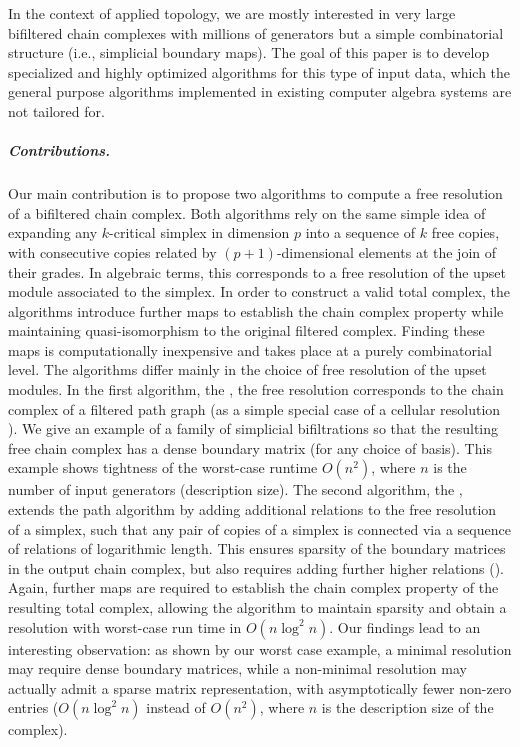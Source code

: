 In the context of applied topology, we are mostly interested in very large bifiltered chain complexes with millions of generators but a simple combinatorial structure (i.e., simplicial boundary maps).
The goal of this paper is to develop specialized and highly optimized algorithms for this type of input data, which the general purpose algorithms implemented in existing computer algebra systems are not tailored for.
%
\subparagraph{Contributions.}
%
Our main contribution is to propose two algorithms to compute a free resolution of a bifiltered chain complex. 
Both algorithms rely on the same simple idea of expanding any $k$-critical simplex in dimension $p$ into a sequence of $k$ free copies, with consecutive copies related by $(p+1)$-dimensional elements at the join of their grades.
In algebraic terms, this corresponds to a free resolution of the upset module associated to the simplex.
In order to construct a valid total complex,
the algorithms introduce further maps to establish the chain complex property while maintaining quasi-isomorphism to the original filtered complex.
Finding these maps is computationally inexpensive and takes place at a purely combinatorial level.
%
%
The algorithms differ mainly in the choice of free resolution of the upset modules. 
In the first algorithm, the , the free resolution corresponds to the chain complex of a filtered path graph (as a simple special case of a cellular resolution \cite{bayer_sturmfels_cellular,miller_sturmfels_book}).
We give an example of a family of simplicial bifiltrations so that the resulting free chain complex has a dense boundary matrix (for any choice of basis).
This example shows tightness of the worst-case runtime $O(n^2)$, where $n$ is the number of input generators (description size). 
%
%
The second algorithm, the , extends the path algorithm by adding additional relations to the free resolution of a simplex, such that any pair of copies of a simplex is connected via a sequence of relations of logarithmic length.
This ensures sparsity of the boundary matrices in the output chain complex, but also requires adding further higher relations (). 
Again, further maps are required to establish the chain complex property of the resulting total complex, allowing the algorithm to maintain sparsity and obtain a resolution with worst-case run time in $O(n\log^2n)$.
%
%
%
Our findings lead to  an interesting observation: as shown by our worst case example, a minimal resolution may require dense boundary matrices, while a non-minimal resolution may actually admit a sparse matrix representation, with asymptotically fewer non-zero entries ($O(n\log^2n)$ instead of $O(n^2)$, where $n$ is the description size of the complex).
